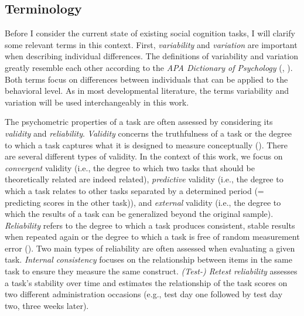 \documentclass[
]{scrbook}
\begin{document}
\subsection{Terminology}\label{terminology-2}

Before I consider the current state of existing social cognition tasks, I will clarify some relevant terms in this context. First, \emph{variability} and \emph{variation} are important when describing individual differences. The definitions of variability and variation greatly resemble each other according to the \emph{APA Dictionary of Psychology} (, ). Both terms focus on differences between individuals that can be applied to the behavioral level. As in most developmental literature, the terms variability and variation will be used interchangeably in this work.

The psychometric properties of a task are often assessed by considering its \emph{validity} and \emph{reliability}. \emph{Validity} concerns the truthfulness of a task or the degree to which a task captures what it is designed to measure conceptually (). There are several different types of validity. In the context of this work, we focus on \emph{convergent} validity (i.e., the degree to which two tasks that should be theoretically related are indeed related), \emph{predictive} validity (i.e., the degree to which a task relates to other tasks separated by a determined period (= predicting scores in the other task)), and \emph{external} validity (i.e., the degree to which the results of a task can be generalized beyond the original sample). \emph{Reliability} refers to the degree to which a task produces consistent, stable results when repeated again or the degree to which a task is free of random measurement error (). Two main types of reliability are often assessed when evaluating a given task. \emph{Internal consistency} focuses on the relationship between items in the same task to ensure they measure the same construct. \emph{(Test-) Retest reliability} assesses a task's stability over time and estimates the relationship of the task scores on two different administration occasions (e.g., test day one followed by test day two, three weeks later).
\end{document}
